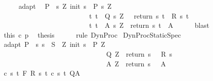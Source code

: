 \begin{isabellebody}
%
\isadelimproof
%
\endisadelimproof
%
\isatagproof
{}\isamarkupfalse%
\ {\isacharminus}\isanewline
\ \ \isamarkupfalse%
\ adapt\ \isamarkupfalse%
\ {\isachardoublequoteopen}P\ {\isasymsubseteq}\ {\isacharbraceleft}s{\isachardot}\ {\isasymexists}Z{\isachardot}\ init\ s\ {\isasymin}\ P{\isacharprime}\ s\ Z\ {\isasymand}\isanewline
\ \ \ \ \ \ \ \ \ \ \ \ \ \ \ \ \ \ \ \ \ \ \ \ \ \ {\isacharparenleft}{\isasymforall}t{\isachardot}\ t\ {\isasymin}\ Q{\isacharprime}\ s\ Z\ {\isasymlongrightarrow}\ \ return\ s\ t\ {\isasymin}\ R\ s\ t{\isacharparenright}\ {\isasymand}\isanewline
\ \ \ \ \ \ \ \ \ \ \ \ \ \ \ \ \ \ \ \ \ \ \ \ \ \ {\isacharparenleft}{\isasymforall}t{\isachardot}\ t\ {\isasymin}\ A{\isacharprime}\ s\ Z\ {\isasymlongrightarrow}\ return\ s\ t\ {\isasymin}\ A{\isacharparenright}{\isacharbraceright}{\isachardoublequoteclose}\isanewline
\ \ \ \ \isamarkupfalse%
\ blast\isanewline
\ \ \isamarkupfalse%
\ this\ c\ p\ \isamarkupfalse%
\ {\isacharquery}thesis\isanewline
\ \ \ \ \isamarkupfalse%
\ {\isacharparenleft}rule\ DynProc{\isacharparenright}\isanewline
{}\isamarkupfalse%
%
\endisatagproof
{\isafoldproof}%
%
\isadelimproof
\isanewline
%
\endisadelimproof
\isanewline
\isanewline
{}\isamarkupfalse%
\ DynProcStaticSpec{\isacharcolon}\ \isanewline
{}\ adapt{\isacharcolon}\ {\isachardoublequoteopen}P\ {\isasymsubseteq}\ {\isacharbraceleft}s{\isachardot}\ s\ {\isasymin}\ S\ {\isasymand}\ {\isacharparenleft}{\isasymexists}Z{\isachardot}\ init\ s\ {\isasymin}\ P{\isacharprime}\ Z\ \ {\isasymand}\ \isanewline
\ \ \ \ \ \ \ \ \ \ \ \ \ \ \ \ \ \ \ \ \ \ \ \ \ \ \ \ {\isacharparenleft}{\isasymforall}{\isasymtau}{\isachardot}\ {\isasymtau}\ {\isasymin}\ Q{\isacharprime}\ Z\ {\isasymlongrightarrow}\ return\ s\ {\isasymtau}\ {\isasymin}\ R\ s\ {\isasymtau}{\isacharparenright}\ {\isasymand}\isanewline
\ \ \ \ \ \ \ \ \ \ \ \ \ \ \ \ \ \ \ \ \ \ \ \ \ \ \ \ {\isacharparenleft}{\isasymforall}{\isasymtau}{\isachardot}\ {\isasymtau}\ {\isasymin}\ A{\isacharprime}\ Z\ {\isasymlongrightarrow}\ return\ s\ {\isasymtau}\ {\isasymin}\ A{\isacharparenright}{\isacharparenright}{\isacharbraceright}{\isachardoublequoteclose}\isanewline
{}\ c{\isacharcolon}\ {\isachardoublequoteopen}{\isasymforall}s\ t{\isachardot}\ {\isasymGamma}{\isacharcomma}{\isasymTheta}{\isasymturnstile}\isactrlbsub {\isacharslash}F\isactrlesub \ {\isacharparenleft}R\ s\ t{\isacharparenright}\ {\isacharparenleft}c\ s\ t{\isacharparenright}\ Q{\isacharcomma}A{\isachardoublequoteclose}\isanewline

\end{isabellebody}
